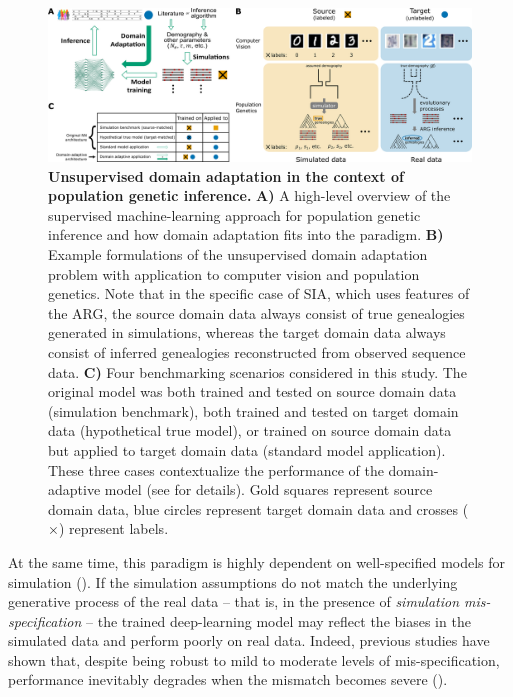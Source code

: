 \begin{figure}[h]
    \centering
    \includegraphics[width=\textwidth]{DA_figs/DA_F1.PNG}
    \caption[Unsupervised domain adaptation in the context of population genetic inference.]{\textbf{Unsupervised domain adaptation in the context of population genetic inference.} \textbf{A)} A high-level overview of the supervised machine-learning approach for population genetic inference and how domain adaptation fits into the paradigm. \textbf{B)} Example formulations of the unsupervised domain adaptation problem with application to computer vision and population genetics. Note that in the specific case of \ac{SIA}, which uses features of the \ac{ARG}, the source domain data always consist of true genealogies generated in simulations, whereas the target domain data always consist of inferred genealogies reconstructed from observed sequence data. \textbf{C)} Four benchmarking scenarios considered in this study. The original model was both trained and tested on source domain data (simulation benchmark), both trained and tested on target domain data (hypothetical true model), or trained on source domain data but applied to target domain data (standard model application). These three cases contextualize the performance of the domain-adaptive model (see  for details). Gold squares represent source domain data, blue circles represent target domain data and crosses ($\mathbf{\times}$) represent labels.}
    \label{fig:DA-F1}
\end{figure}

At the same time, this paradigm is highly dependent on well-specified models for simulation (\cite{korfmann_deep_2023}). If the simulation assumptions do not match the underlying generative process of the real data -- that is, in the presence of \textit{simulation mis-specification} -- the trained deep-learning model may reflect the biases in the simulated data and perform poorly on real data. Indeed, previous studies have shown that, despite being robust to mild to moderate levels of mis-specification, performance inevitably degrades when the mismatch becomes severe (\cite{adrion_predicting_2020,hejase_deep-learning_2022}).

